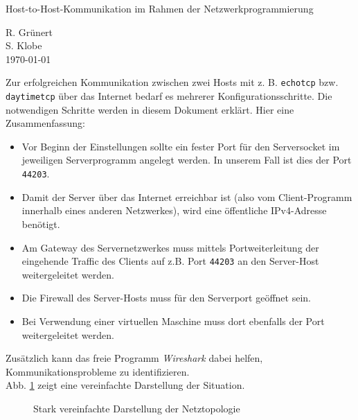 \documentclass[11pt, a4paper]{article}
\newcommand{\code}[1]{{\lstinline{#1}}}
\begin{document}
\begin{center}
  \Large{Host-to-Host-Kommunikation im Rahmen der Netzwerkprogrammierung}
\end{center}

\begin{flushright}
  R. Grünert\\
  S. Klobe\\
  \today
\end{flushright}

Zur erfolgreichen Kommunikation zwischen zwei Hosts mit z. B. \code{echotcp}
bzw. \code{daytimetcp} über das Internet bedarf es mehrerer
Konfigurationsschritte. Die notwendigen Schritte werden in diesem Dokument
erklärt. Hier eine Zusammenfassung:

\begin{itemize}

  \item Vor Beginn der Einstellungen sollte ein fester Port für den Serversocket
        im jeweiligen Serverprogramm angelegt werden. In unserem Fall ist dies
        der Port \code{44203}.

  \item Damit der Server über das Internet erreichbar ist (also vom
        Client-Programm innerhalb eines anderen Netzwerkes), wird eine
        öffentliche IPv4-Adresse benötigt.

  \item Am Gateway des Servernetzwerkes muss mittels Portweiterleitung der
        eingehende Traffic des Clients auf z.B. Port \code{44203} an den
        Server-Host weitergeleitet werden.

  \item Die Firewall des Server-Hosts muss für den Serverport geöffnet sein.

  \item Bei Verwendung einer virtuellen Maschine muss dort ebenfalls der Port
        weitergeleitet werden.

\end{itemize}

Zusätzlich kann das freie Programm \textit{Wireshark} dabei helfen,
Kommunikationsprobleme zu identifizieren.\\

Abb. \ref{beep} zeigt eine vereinfachte Darstellung der Situation.

\begin{figure}[H]
\centering
{}
\caption{Stark vereinfachte Darstellung der Netztopologie}\label{beep}
\end{figure}
\end{document}
